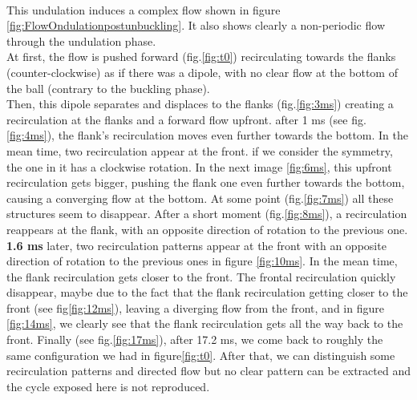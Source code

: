 \documentclass[a4paper,10pt]{report}
\begin{document}
\paragraph{}
This undulation induces a complex flow shown in figure \ref{fig:FlowOndulationpostunbuckling}. It also shows clearly a non-periodic flow through the undulation phase.
\\
At first, the flow is pushed forward (fig.\ref{fig:t0}) recirculating towards the flanks (counter-clockwise) as if there was a dipole, with no clear flow at the bottom of the ball (contrary to the buckling phase).\\
Then, this dipole separates and displaces to the flanks (fig.\ref{fig:3ms}) creating a recirculation at the flanks and a forward flow upfront.
after 1 ms (see fig.\ref{fig:4ms}), the flank's recirculation moves even further towards the bottom. In the mean time, two recirculation appear at the front. if we consider the symmetry, the one in it has a clockwise rotation.
In the next image \ref{fig:6ms}, this upfront recirculation gets  bigger, pushing the flank one even further towards the bottom, causing a converging flow at the bottom.
At some point (fig.\ref{fig:7ms}) all these structures seem to disappear. After a short moment (fig.\ref{fig:8ms}), a recirculation reappears at the flank, with an opposite direction of rotation to the previous one. \textbf{1.6 ms} later, two recirculation patterns appear at the front with an opposite direction of rotation to the previous ones in figure \ref{fig:10ms}. In the mean time, the flank recirculation gets closer to  the front. The frontal recirculation quickly disappear, maybe due to the fact that the flank recirculation getting closer to the front (see fig\ref{fig:12ms}), leaving a diverging flow from the front, and in figure \ref{fig:14ms}, we clearly see that the flank recirculation gets all the way back to the front. Finally (see fig.\ref{fig:17ms}), after 17.2 ms, we come back to roughly the same configuration we had in figure\ref{fig:t0}. After that, we can distinguish some recirculation patterns and directed flow but no clear pattern can be extracted and the cycle exposed here is not reproduced.
\end{document}
